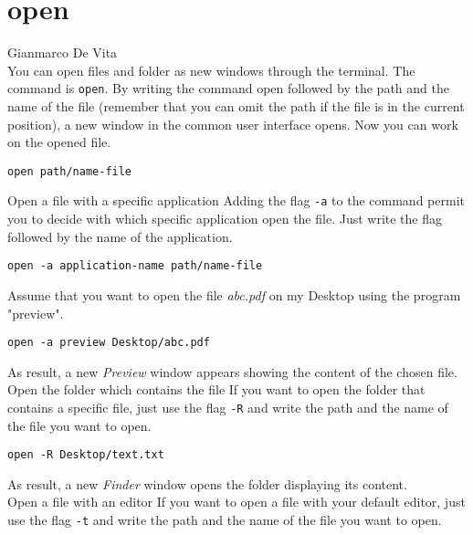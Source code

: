\documentclass[hidelinks,12pt,a4paper,numbers=enddot]{scrartcl}
\begin{document}
\section{open}


\large Gianmarco De Vita \normalsize\\



You can open files and folder as new windows through the terminal.
The command is \texttt{open}. By writing the command open followed by the
path and the name of the file (remember that you can omit the path if
the file is in the current position), a new window in the common user
interface opens. Now you can work on the opened file.

\begin{verbatim}
open path/name-file
\end{verbatim}

Open a file with a specific application
Adding the flag \texttt{-a} to the command permit you to decide with
which specific application open the file. Just write the flag followed by the
name of the application.

\begin{verbatim}
open -a application-name path/name-file
\end{verbatim}

Assume that you want to open the file \emph{abc.pdf} on my Desktop using the program "preview".

\begin{verbatim}
open -a preview Desktop/abc.pdf
\end{verbatim}

As result, a new \emph{Preview} window appears showing the content of the
chosen file.\\

Open the folder which contains the file
If you want to open the folder that contains a specific file, just use
the flag \texttt{-R} and write the path and the name of the file you want to open.

\begin{verbatim}
open -R Desktop/text.txt
\end{verbatim}

As result, a new \emph{Finder} window opens the folder displaying its content.\\

Open a file with an editor
If you want to open a file with your default editor,
just use the flag \texttt{-t} and write the path and the name of
the file you want to open.
\end{document}
